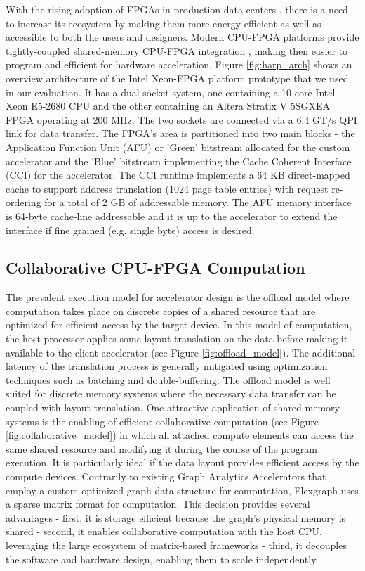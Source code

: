 With the rising adoption of FPGAs in production data centers \cite{Catapult}, there is a need to increase its ecosystem by making them more energy efficient as well as accessible to both the users and designers. Modern CPU-FPGA platforms \cite{CPU-FPGA} provide tightly-coupled shared-memory CPU-FPGA integration \cite{CAPI} \cite{CCI}, making then easier to program and efficient for hardware acceleration. Figure \ref{fig:harp_arch} shows an overview architecture of the Intel Xeon-FPGA platform prototype that we used in our evaluation. It has a dual-socket system, one containing a 10-core Intel Xeon E5-2680 CPU and the other containing an Altera Stratix V 5SGXEA FPGA operating at 200 MHz. The two sockets are connected via a 6.4 GT/s QPI \cite{QPI} link for data transfer. The FPGA's area is partitioned into two main blocks - the Application Function Unit (AFU) or 'Green' bitstream allocated for the custom accelerator and the 'Blue' bitstream implementing the Cache Coherent Interface (CCI) for the accelerator. The CCI runtime implements a 64 KB direct-mapped cache to support address translation (1024 page table entries) with request re-ordering for a total of 2 GB of addressable memory. The AFU memory interface is 64-byte cache-line addressable and it is up to the accelerator to extend the interface if fine grained (e.g. single byte) access is desired.

\subsection{Collaborative CPU-FPGA Computation}

The prevalent execution model for accelerator design is the offload model \cite{Accelerators} where computation takes place on discrete copies of a shared resource that are optimized for efficient access by the target device. In this model of computation, the host processor applies some layout translation on the data before making it available to the client accelerator (see Figure \ref{fig:offload_model}). The additional latency of the translation process is generally mitigated using optimization techniques such as batching and double-buffering. The offload model is well suited for discrete memory systems where the necessary data transfer can be coupled with layout translation. One attractive application of shared-memory systems is the enabling of efficient collaborative computation (see Figure \ref{fig:collaborative_model}) in which all attached compute elements can access the same shared resource and modifying it during the course of the program execution. It is particularly ideal if the data layout provides efficient access by the compute devices. Contrarily to existing Graph Analytics Accelerators \cite{Graphicionado} \cite{GraphOps} that employ a custom optimized graph data structure for computation, Flexgraph uses a sparse matrix format for computation. This decision provides several advantages - first, it is storage efficient because the graph's physical memory is shared - second, it enables collaborative computation with the host CPU, leveraging the large ecosystem of matrix-based frameworks \cite{CombBlas} \cite{Pegasus} - third, it decouples the software and hardware design, enabling them to scale independently.

